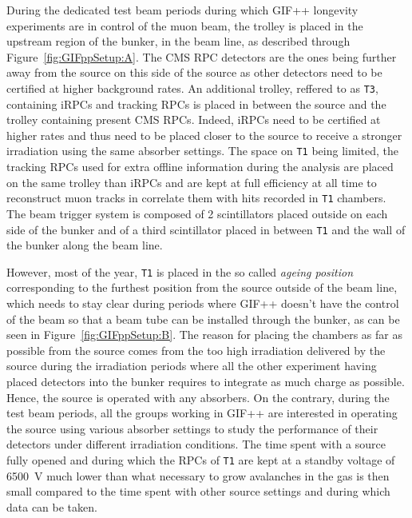 	During the dedicated test beam periods during which GIF++ longevity experiments are in control of the muon beam, the trolley is placed in the upstream region of the bunker, in the beam line, as described through Figure~\ref{fig:GIFppSetup:A}. The CMS RPC detectors are the ones being further away from the source on this side of the source as other detectors need to be certified at higher background rates. An additional trolley, reffered to as \texttt{T3}, containing iRPCs and tracking RPCs is placed in between the source and the trolley containing present CMS RPCs. Indeed, iRPCs need to be certified at higher rates and thus need to be placed closer to the source to receive a stronger irradiation using the same absorber settings. The space on \texttt{T1} being limited, the tracking RPCs used for extra offline information during the analysis are placed on the same trolley than iRPCs and are kept at full efficiency at all time to reconstruct muon tracks in correlate them with hits recorded in \texttt{T1} chambers. The beam trigger system is composed of 2 scintillators placed outside on each side of the bunker and of a third scintillator placed in between \texttt{T1} and the wall of the bunker along the beam line.
	
	However, most of the year, \texttt{T1} is placed in the so called \textit{ageing position} corresponding to the furthest position from the source outside of the beam line, which needs to stay clear during periods where GIF++ doesn't have the control of the beam so that a beam tube can be installed through the bunker, as can be seen in Figure~\ref{fig:GIFppSetup:B}. The reason for placing the chambers as far as possible from the source comes from the too high irradiation delivered by the source during the irradiation periods where all the other experiment having placed detectors into the bunker requires to integrate as much charge as possible. Hence, the source is operated with any absorbers. On the contrary, during the test beam periods, all the groups working in GIF++ are interested in operating the source using various absorber settings to study the performance of their detectors under different irradiation conditions. The time spent with a source fully opened and during which the RPCs of \texttt{T1} are kept at a standby voltage of \SI{6500}{V} much lower than what necessary to grow avalanches in the gas is then small compared to the time spent with other source settings and during which data can be taken.
	
